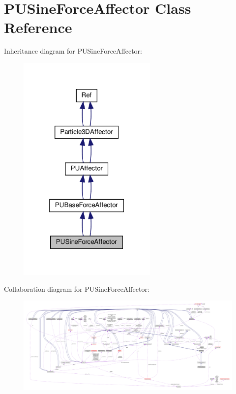 \hypertarget{classPUSineForceAffector}{}\section{P\+U\+Sine\+Force\+Affector Class Reference}
\label{classPUSineForceAffector}


Inheritance diagram for P\+U\+Sine\+Force\+Affector\+:
\nopagebreak
\begin{figure}[H]
\begin{center}
\leavevmode
\includegraphics[width=193pt]{classPUSineForceAffector__inherit__graph}
\end{center}
\end{figure}


Collaboration diagram for P\+U\+Sine\+Force\+Affector\+:
\nopagebreak
\begin{figure}[H]
\begin{center}
\leavevmode
\includegraphics[width=350pt]{classPUSineForceAffector__coll__graph}
\end{center}
\end{figure}

